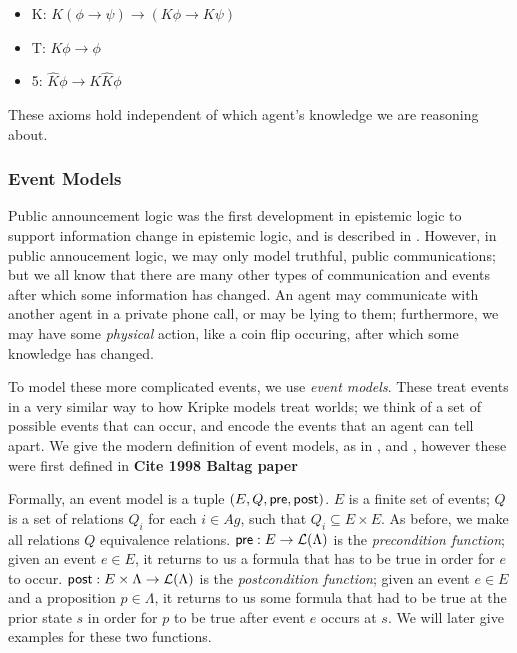 \documentclass[12pt, a4paper]{article}
\begin{document}
\begin{itemize}
\item \textsf{K}: $K (\phi \rightarrow \psi) \rightarrow (K \phi \rightarrow K
  \psi)$
\item \textsf{T}: $K \phi \rightarrow \phi$
\item \textsf{5}: $\widehat K \phi \rightarrow K \widehat K \phi$
\end{itemize}

These axioms hold independent of which agent's knowledge we are reasoning about. 

\subsubsection{Event Models}
\label{sec:Event Models}

Public announcement logic was the first development in epistemic logic to
support information change in epistemic logic, and is described in \cite{PAL}.
However, in public annoucement logic, we may only model truthful, public
communications; but we all know that there are many other types of communication
and events after which some information has changed. An agent may communicate
with another agent in a private phone call, or may be lying to them;
furthermore, we may have some \textit{physical} action, like a coin flip
occuring, after which some knowledge has changed.

To model these more complicated events, we use \textit{event models}. These
treat events in a very similar way to how Kripke models treat worlds; we think
of a set of possible events that can occur, and encode the events that an agent
can tell apart. We give the modern definition of event models, as in
\cite{MalvinThesis}, and \cite{AutomataTechniques}, however these were first
defined in \textbf{Cite 1998 Baltag paper}

Formally, an event model  is a tuple $(E, Q, \textsf{pre}, \textsf{post})$. $E$ is a finite set
of events; $Q$ is a set of relations $Q_i$ for each $i \in Ag$, such that $Q_i
\subseteq E \times E$. As before, we make all relations $Q$ equivalence
relations. $\textsf{pre} : E \rightarrow \mathcal{L}(\Lambda) $ is the \textit{precondition
  function}; given an event $e \in E$, it returns to us a formula that has to be
true in order for $e$ to occur. $\textsf{post} : E \times \Lambda \rightarrow
\mathcal{L}(\Lambda)$ is the \textit{postcondition function}; given an event $e \in
E$ and a proposition $p \in \Lambda$, it returns to us some formula that had to
be true at the prior state $s$ in order for $p$ to be true after event $e$
occurs at $s$. We will later give examples for these two functions.
\end{document}
